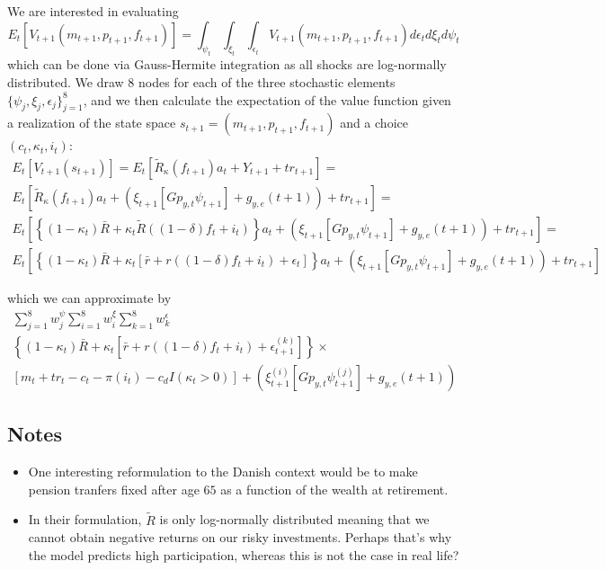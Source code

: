 We are interested in evaluating
\[
E_{t}[V_{t+1}(m_{t+1},p_{t+1},f_{t+1})]=\int_{\psi_{t}}\int_{\xi_{t}}\int_{\epsilon_{t}}V_{t+1}(m_{t+1},p_{t+1},f_{t+1})d\epsilon_{t}d\xi_{t}d\psi_{t}
\]
which can be done via Gauss-Hermite integration as all shocks are
log-normally distributed. We draw $8$ nodes for each of the three
stochastic elements $\{\psi_{j},\xi_{j},\epsilon_{j}\}_{j=1}^{8}$,
and we then calculate the expectation of the value function given
a realization of the state space $s_{t+1}=(m_{t+1},p_{t+1},f_{t+1})$
and a choice $(c_{t},\kappa_{t},i_{t})$:
\begin{gather*}
E_{t}[V_{t+1}(s_{t+1})]=E_{t}[\tilde{R}_{\kappa}(f_{t+1})a_{t}+Y_{t+1}+tr_{t+1}] =\\E_{t}\left[\tilde{R}_{\kappa}(f_{t+1})a_{t}+\left(\xi_{t+1}\left[Gp_{y,t}\psi_{t+1}\right]+g_{y,e}(t+1)\right)+tr_{t+1}\right]=\\
E_{t}\left[\left\{ (1-\kappa_{t})\bar{R}+\kappa_{t}\tilde{R}((1-\delta)f_{t}+i_{t})\right\} a_{t}+\left(\xi_{t+1}\left[Gp_{y,t}\psi_{t+1}\right]+g_{y,e}(t+1)\right)+tr_{t+1}\right]=\\
E_{t}\left[\left\{ (1-\kappa_{t})\bar{R}+\kappa_{t}\left[\bar{r}+r\left((1-\delta)f_{t}+i_{t}\right)+\epsilon_{t}\right]\right\} a_{t} + \left(\xi_{t+1}\left[Gp_{y,t}\psi_{t+1}\right]+g_{y,e}(t+1)\right)+tr_{t+1}\right]
\end{gather*}

which we can approximate by
\begin{gather*}
\sum_{j=1}^{8}w_{j}^{\psi}\sum_{i=1}^{8}w_{i}^{\xi}\sum_{k=1}^{8}w_{k}^{\epsilon} \\
\left\{ (1-\kappa_{t})\bar{R}+\kappa_{t}\left[\bar{r}+r\left((1-\delta)f_{t}+i_{t}\right)+\epsilon_{t+1}^{(k)}\right]\right\} \times \\ \left[m_{t}+tr_{t}-c_{t}-\pi(i_{t})-c_{d}I(\kappa_{t}>0)\right]+\left(\xi_{t+1}^{(i)}\left[Gp_{y,t}\psi_{t+1}^{(j)}\right]+g_{y,e}(t+1)\right)
\end{gather*}

\subsection{Notes}
\begin{itemize}
\item One interesting reformulation to the Danish context would be to make
pension tranfers fixed after age $65$ as a function of the wealth
at retirement.
\item In their formulation, $\tilde{R}$ is only log-normally distributed
meaning that we cannot obtain negative returns on our risky investments.
Perhaps that's why the model predicts high participation, whereas
this is not the case in real life?
\end{itemize}
